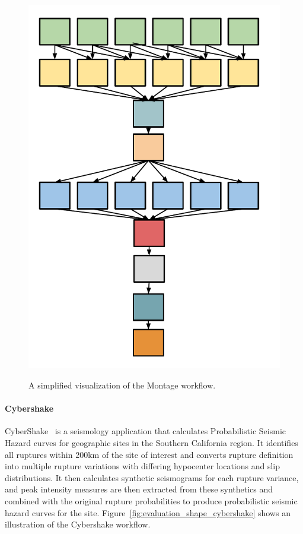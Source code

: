 \begin{figure}[htb]
	\centering
	\includegraphics[width=0.55\linewidth]{figures/balance/figure15.pdf} \\
	\caption{A simplified visualization of the Montage workflow.}
	\label{fig:evaluation_shape_montage}
\end{figure}

\paragraph{\textbf{Cybershake}}
CyberShake~\cite{Graves2010} is a seismology application that calculates Probabilistic Seismic Hazard curves for geographic sites in the Southern California region. It identifies all ruptures within 200km of the site of interest and converts rupture definition into multiple rupture variations with differing hypocenter locations and slip distributions. It then calculates synthetic seismograms for each rupture variance, and peak intensity measures are then extracted from these synthetics and combined with the original rupture probabilities to produce probabilistic seismic hazard curves for the site. Figure~\ref{fig:evaluation_shape_cybershake} shows an illustration of the Cybershake workflow.

